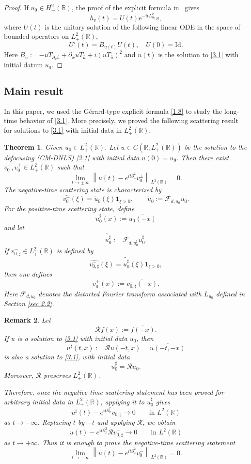 \documentclass[10pt]{article}
\newtheorem{theorem}{Theorem}
\newtheorem{remark}[theorem]{Remark}
\numberwithin{equation}{section}
\numberwithin{theorem}{section}
\begin{document}
\begin{proof}
If $u_0\in H_{+}^2(\mathbb{R})$, the proof of the explicit formula in~\cite{1,2} gives 
\[h_v (t) =U(t)\mathrm{e}^{-i tL_{u_0}^2} v,\]
where $U(t)$ is the unitary solution of the following linear ODE in the space of bounded operators on $L^2_+(\mathbb R)$, 
\[ U'(t)=B_{u(t)}U(t),\quad U(0)=\mathrm{Id}. \]
Here $B_u:=-u T_{\partial_x \bar{u}}+\partial_x u T_{\bar{u}}+i\left(u T_{\bar{u}}\right)^2$ and $u(t)$ is the solution to \eqref{3.1} with initial datum $u_0$.
\end{proof}
\subsection{Main result}
In this paper, we used the Gérard-type explicit formula \eqref{1.8} to study the long-time behavior of \eqref{3.1}. More precisely, we proved the following scattering result for solutions to \eqref{3.1} with initial data in $L_{+}^{2}(\mathbb R)$.
\begin{theorem}
\label{theorem 1.5}
Given $u_0\in L_+^{2}(\mathbb R)$. Let \(u\in C(\mathbb R;L_+^2(\mathbb R))\) be the solution to the
defocusing (CM-DNLS) \eqref{3.1} with initial data \(u(0)=u_0\). Then there exist
\(v_0^-,v_0^+\in L_+^2(\mathbb R)\) such that
\begin{equation}
\label{3.13}
\lim_{t\to\pm\infty}
\left\|
u(t)-e^{it\partial_x^2}v_0^\pm
\right\|_{L^2(\mathbb R)}
=0.
\end{equation}
The negative-time scattering state is characterized by
\[
\widehat{v_0^-}(\xi)
=
\widetilde u_0(\xi)\mathbf 1_{\xi>0},
\qquad
\widetilde u_0:=\mathcal F_{d,u_0}u_0.
\]
For the positive-time scattering state, define
\[
u_0^\sharp(x):=\overline{u_0(-x)}
\]
and let
\[
\widetilde{u_0^\sharp}
:=
\mathcal F_{d,u_0^\sharp}u_0^\sharp .
\]
If \(v_{0,\sharp}^-\in L_+^2(\mathbb R)\) is defined by
\[
\widehat{v_{0,\sharp}^-}(\xi)
=
\widetilde{u_0^\sharp}(\xi)\mathbf 1_{\xi>0},
\]
then one defines
\[
v_0^+(x):=\overline{v_{0,\sharp}^-(-x)}.
\]
Here \(\mathcal F_{d,u_0}\) denotes the distorted Fourier transform associated with
\(L_{u_0}\) defined in Section \ref{sec 2.2}.
\end{theorem}
\begin{remark}
\label{remark 1.101}
Let
\[
\mathcal R f(x):=\overline{f(-x)}.
\]
If \(u\) is a solution to \eqref{3.1} with initial data \(u_0\), then
\[
u^\sharp(t,x):=\mathcal R u(-t,x)=\overline{u(-t,-x)}
\]
is also a solution to \eqref{3.1}, with initial data
\[
u_0^\sharp=\mathcal R u_0.
\]
Moreover, \(\mathcal R\) preserves \(L_{+}^{2}(\mathbb R)\).

Therefore, once the negative-time scattering statement has been proved for arbitrary
initial data in \(L_{+}^{2}(\mathbb R)\), applying it to \(u_0^\sharp\) gives
\[
u^\sharp(t)-e^{it\partial_x^2}v_{0,\sharp}^-
\to0
\qquad\text{in }L^2(\mathbb R)
\]
as \(t\to-\infty\). Replacing \(t\) by \(-t\) and applying \(\mathcal R\), we obtain
\[
u(t)-e^{it\partial_x^2}\mathcal R v_{0,\sharp}^-
\to0
\qquad\text{in }L^2(\mathbb R)
\]
as \(t\to+\infty\). Thus it is enough to prove the negative-time scattering statement
\[
\lim_{t\to-\infty}
\left\|
u(t)-e^{it\partial_x^2}v_0^-
\right\|_{L^2(\mathbb R)}
=0.
\]
\end{remark}
\end{document}
